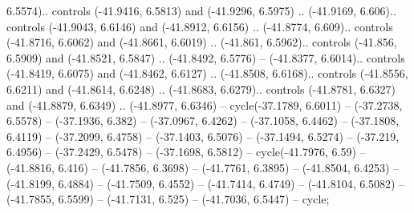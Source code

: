 \begin{scope}[shift={(2.5552, 9.9912)}]
\begin{scope}[shift={(48.1654, -14.8546)}]
6.5574).. controls (-41.9416, 6.5813) and (-41.9296, 6.5975) .. (-41.9169, 6.606).. controls (-41.9043, 6.6146) and (-41.8912, 6.6156) .. (-41.8774, 6.609).. controls (-41.8716, 6.6062) and (-41.8661, 6.6019) .. (-41.861, 6.5962).. controls (-41.856, 6.5909) and (-41.8521, 6.5847) .. (-41.8492, 6.5776) -- (-41.8377, 6.6014).. controls (-41.8419, 6.6075) and (-41.8462, 6.6127) .. (-41.8508, 6.6168).. controls (-41.8556, 6.6211) and (-41.8614, 6.6248) .. (-41.8683, 6.6279).. controls (-41.8781, 6.6327) and (-41.8879, 6.6349) .. (-41.8977, 6.6346) -- cycle(-37.1789, 6.6011) -- (-37.2738, 6.5578) -- (-37.1936, 6.382) -- (-37.0967, 6.4262) -- (-37.1058, 6.4462) -- (-37.1808, 6.4119) -- (-37.2099, 6.4758) -- (-37.1403, 6.5076) -- (-37.1494, 6.5274) -- (-37.219, 6.4956) -- (-37.2429, 6.5478) -- (-37.1698, 6.5812) -- cycle(-41.7976, 6.59) -- (-41.8816, 6.416) -- (-41.7856, 6.3698) -- (-41.7761, 6.3895) -- (-41.8504, 6.4253) -- (-41.8199, 6.4884) -- (-41.7509, 6.4552) -- (-41.7414, 6.4749) -- (-41.8104, 6.5082) -- (-41.7855, 6.5599) -- (-41.7131, 6.525) -- (-41.7036, 6.5447) -- cycle;




\end{scope}
\end{scope}
